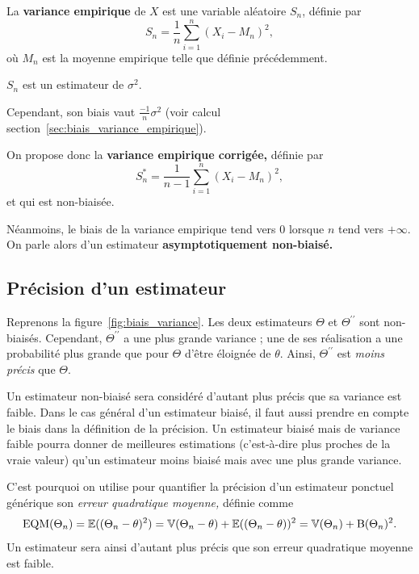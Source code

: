La \textbf{variance empirique} de $X$ est une variable aléatoire $S_n$, définie
par
\begin{equation}
  S_n = \frac1n \sum_{i=1}^n (X_i - M_n)^2,
  \label{eq:variance_empirique}
\end{equation}
où $M_n$ est la moyenne empirique telle que définie précédemment.

$S_n$ est un estimateur de $\sigma^2.$

Cependant, son biais vaut $\frac{-1}{n} \sigma^2$  (voir calcul
  section~\ref{sec:biais_variance_empirique}).

On propose donc la \textbf{variance empirique corrigée,} définie par 
\begin{equation}
  S^*_n = \frac1{n-1} \sum_{i=1}^n (X_i - M_n)^2,
  \label{eq:variance_empirique_corrigee}
\end{equation}
et qui est non-biaisée.

Néanmoins, le biais de la variance empirique tend vers 0 lorsque $n$ tend vers
$+\infty$. On parle alors d'un estimateur \textbf{asymptotiquement non-biaisé.}

\subsection{Précision d'un estimateur}
\label{sec:precision_estimateur}

Reprenons la figure~\ref{fig:biais_variance}. Les deux estimateurs $\Theta$ et
$\Theta^{\prime\prime}$ sont non-biaisés. Cependant, $\Theta^{\prime\prime}$ a
une plus grande variance ; une de ses réalisation a une probabilité plus grande
que pour $\Theta$ d'être éloignée de $\theta$. Ainsi, $\Theta^{\prime\prime}$
est \textit{moins précis} que $\Theta.$
  
Un estimateur non-biaisé sera considéré d'autant plus précis que sa variance
est faible.  Dans le cas général d'un estimateur biaisé, il faut aussi prendre
en compte le biais dans la définition de la précision. Un estimateur biaisé
mais de variance faible pourra donner de meilleures estimations (c'est-à-dire
plus proches de la vraie valeur) qu'un estimateur moins biaisé mais avec une
plus grande variance.

C'est pourquoi on utilise pour quantifier la précision d'un estimateur ponctuel
générique son \textit{erreur quadratique moyenne,} définie comme
\begin{equation}
  \text{EQM}(\Theta_n) = \mathbb{E}((\Theta_n - \theta)^2) = \mathbb{V}(\Theta_n - \theta) + \mathbb{E}((\Theta_n - \theta))^2
  = \mathbb{V}(\Theta_n) + \text{B}(\Theta_n)^2.
  \label{eq:eqm}
\end{equation}
Un estimateur sera ainsi d'autant plus précis que son erreur quadratique moyenne est faible.

